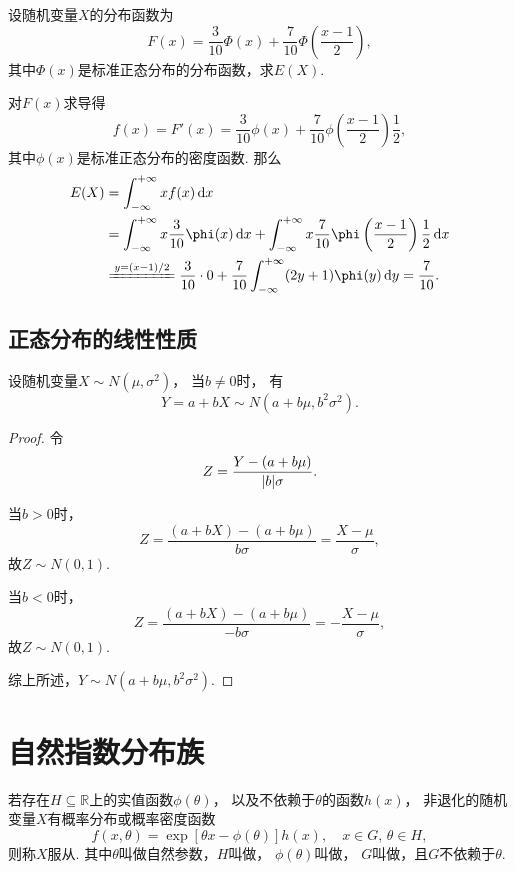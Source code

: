 \begin{example}
设随机变量\(X\)的分布函数为\[
	F(x) = \frac{3}{10} \Phi(x) + \frac{7}{10} \Phi\left(\frac{x-1}{2}\right),
\]
其中\(\Phi(x)\)是标准正态分布的分布函数，求\(E(X)\).
\begin{solution}
对\(F(x)\)求导得\[
	f(x) = F'(x)
	= \frac{3}{10} \phi(x)
		+ \frac{7}{10} \phi\left(\frac{x-1}{2}\right) \frac{1}{2},
\]
其中\(\phi(x)\)是标准正态分布的密度函数.
那么\begin{align*}
	E(X) &= \int_{-\infty}^{+\infty} x f(x) \dd{x} \\
	&= \int_{-\infty}^{+\infty} x \frac{3}{10} \phi(x) \dd{x}
	+ \int_{-\infty}^{+\infty} x \frac{7}{10} \phi\left(\frac{x-1}{2}\right) \frac{1}{2} \dd{x} \\
	&\xlongequal{y=(x-1)/2} \frac{3}{10} \cdot 0
	+ \frac{7}{10} \int_{-\infty}^{+\infty} (2y+1) \phi(y) \dd{y}
	= \frac{7}{10}.
\end{align*}
\end{solution}
\end{example}

\subsection{正态分布的线性性质}
\begin{theorem}\label{theorem:正态分布与自然指数分布族.正态分布的线性性质}
设随机变量\(X \sim N(\mu,\sigma^2)\)，
当\(b \neq 0\)时，
有\begin{equation}
	Y = a+bX \sim N(a+b\mu,b^2\sigma^2).
\end{equation}
\begin{proof}
令\[
	Z = \frac{Y-(a+b\mu)}{\abs{b}\sigma}.
\]

当\(b > 0\)时，\[
	Z = \frac{(a+bX)-(a+b\mu)}{b\sigma}=\frac{X-\mu}{\sigma},
\]
故\(Z \sim N(0,1)\).

当\(b < 0\)时，\[
Z = \frac{(a+bX)-(a+b\mu)}{-b\sigma}=-\frac{X-\mu}{\sigma},
\]
故\(Z \sim N(0,1)\).

综上所述，\(Y \sim N(a+b\mu,b^2\sigma^2)\).
\end{proof}
\end{theorem}



\section{自然指数分布族}
\begin{definition}
若存在\(H \subseteq \mathbb{R}\)上的实值函数\(\phi(\theta)\)，
以及不依赖于\(\theta\)的函数\(h(x)\)，
非退化的随机变量\(X\)有概率分布或概率密度函数\[
f(x,\theta) = \exp[\theta x - \phi(\theta)] h(x),
\quad x \in G,\,\theta \in H,
\]则称\(X\)服从.
其中\(\theta\)叫做自然参数，\(H\)叫做，
\(\phi(\theta)\)叫做，
\(G\)叫做，且\(G\)不依赖于\(\theta\).
\end{definition}

